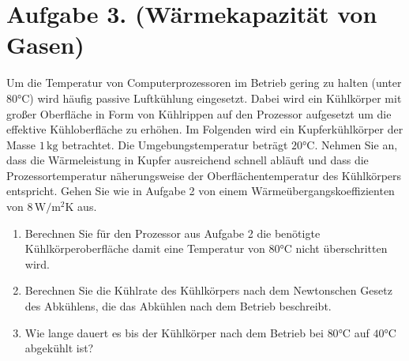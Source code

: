\documentclass[german,12pt]{homework}
\newcommand{\degC}{\si{\degreeCelsius}}
\begin{document}
    \section*{Aufgabe 3. (Wärmekapazität von Gasen)}

    \begin{problem}
        Um die Temperatur von Computerprozessoren im Betrieb gering zu halten
        (unter \(80\degC\)) wird häufig passive Luftkühlung
        eingesetzt. Dabei wird ein Kühlkörper mit großer Oberfläche in Form von
        Kühlrippen auf den Prozessor aufgesetzt um die effektive Kühloberfläche
        zu erhöhen. Im Folgenden wird ein Kupferkühlkörper der Masse
        \(1\,\si{\kilogram}\) betrachtet. Die Umgebungstemperatur beträgt
        \(20\degC\). Nehmen Sie an, dass die Wärmeleistung in
        Kupfer ausreichend schnell abläuft und dass die Prozessortemperatur
        näherungsweise der Oberflächentemperatur des Kühlkörpers entspricht.
        Gehen Sie wie in Aufgabe 2 von einem Wärmeübergangskoeffizienten von
        \(8\,\si{\watt\per\meter\squared\kelvin}\) aus.
        \begin{enumerate}
            \item Berechnen Sie für den Prozessor aus Aufgabe 2 die benötigte
            Kühlkörperoberfläche damit eine Temperatur von
            \(80\degC\) nicht überschritten wird.
            \item Berechnen Sie die Kühlrate des Kühlkörpers nach dem
            Newtonschen Gesetz des Abkühlens, die das Abkühlen nach dem Betrieb
            beschreibt.
            \item Wie lange dauert es bis der Kühlkörper nach dem Betrieb bei
            \(80\degC\) auf \(40\degC\) abgekühlt
            ist?
        \end{enumerate}
    \end{problem}
\end{document}
